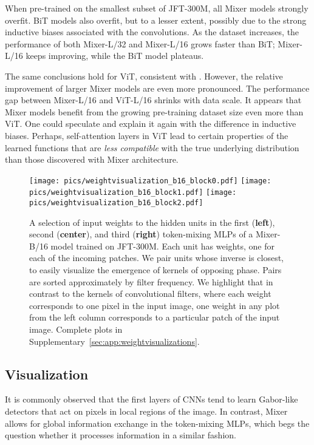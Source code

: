 \documentclass{article}
\newcommand{\name}{Mixer}
\begin{document}
When pre-trained on the smallest subset of JFT-300M, all \name{} models strongly overfit. 
BiT models also overfit, but to a lesser extent, possibly due to the strong inductive biases associated with the convolutions.
As the dataset increases, the performance of both \name{}-L/32 and \name{}-L/16 grows faster than BiT; \name{}-L/16 keeps improving, while the BiT model plateaus.

The same conclusions hold for ViT, consistent with \citet{Dosovitskiy2021}. However, the relative improvement of larger \name{} models are even more pronounced.
The performance gap between \name{}-L/16 and ViT-L/16 shrinks with data scale.
It appears that \name{} models benefit from the growing pre-training dataset size even more than ViT. 
One could speculate and explain it again with the difference in inductive biases. Perhaps, self-attention layers in ViT lead to certain properties of the learned functions that are \emph{less compatible} with the true underlying distribution than those discovered with \name{} architecture.

\begin{figure}[tb]
    \centering
    \texttt{[image: pics/weightvisualization\_b16\_block0.pdf]}\hfill
    \texttt{[image: pics/weightvisualization\_b16\_block1.pdf]}\hfill
    \texttt{[image: pics/weightvisualization\_b16\_block2.pdf]} 
    \caption{
     A selection of input weights to the hidden units in the first ({\bf left}), second ({\bf center}), and third ({\bf right}) token-mixing MLPs of a \name{}-B/16 model trained on JFT-300M.
     Each unit has  weights, one for each of the  incoming patches. 
     We pair units whose inverse is closest, to easily visualize the emergence of kernels of opposing phase.
     Pairs are sorted approximately by filter frequency.
     We highlight that in contrast to the kernels of convolutional filters, where each weight corresponds to one pixel in the input image, one weight in any plot from the left column corresponds to a particular  patch of the input image. 
     Complete plots in Supplementary~\ref{sec:app:weightvisualizations}.
    }
  \label{fig:weight-plots}
\end{figure}

\subsection{Visualization}
It is commonly observed that the first layers of CNNs tend to learn Gabor-like detectors that act on pixels in local regions of the image. In contrast, \name{} allows for global information exchange in the token-mixing MLPs, which begs the question whether it processes information in a similar fashion.
\end{document}
